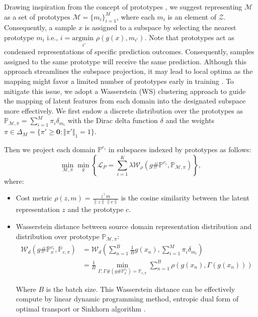 Drawing inspiration from the concept of prototypes \cite{snell2017prototypical}, we suggest representing $\mathcal{M}$ as a set of prototypes $\mathcal{M} = \{m_i\}_{i=1}^{M}$, where each $m_i$ is an element of $\mathcal{Z}$. Consequently, a sample $x$ is assigned to a subspace by selecting the nearest prototype $m_i$ i.e., $i=\underset{ i'}{\text{argmin }} \rho(g(x),m_{i'})$. Note that prototypes act as condensed representations of specific prediction outcomes. Consequently, samples assigned to the same prototype will receive the same prediction. Although this approach streamlines the subspace projection, it may lead to local optima as the mapping might favor a limited number of prototypes early in training \cite{vuong2023vector}. To mitigate this issue, we adopt a Wasserstein (WS) clustering approach \cite{vuong2023vector} to guide the mapping of latent features from each domain into the designated subspace more effectively.
We first endow a discrete distribution over the prototypes as $\mathbb{P}_{\mathcal{M},\pi}=\sum_{i=1}^{M}\pi_{i}\delta_{m_{i}}$
with the Dirac delta function $\delta$ and the weights $\pi\in\Delta_{M}= \{\pi'\geq \boldsymbol{0}: \Vert \pi'\Vert_1 =1\}$. 

Then we project each domain $\mathbb{P}^{e_i}$ in subspaces indexed by prototypes as follows:
\begin{equation}
\min_{\mathcal{M},\pi}\min_{g}\left \{\mathcal{L}_{P}=\sum_{i=1}^K\lambda\mathcal{W}_{\rho}\left(g\#\mathbb{P}^{e_i},\mathbb{P}_{\mathcal{M},\pi}\right)\right \},\label{eq:reconstruct_form_continuous}
\end{equation}
where:
\begin{itemize}
    \item Cost metric $\rho(z,m)=\frac{z^\top m}{\left \| z \right \|\left \| c \right \|}$ is the cosine similarity between the latent representation $z$ and the prototype $c$.
    \item  Wasserstein distance between source domain representation distribution and distribution over prototype $\mathbb{P}_{\mathcal{M},\pi}$:
\begin{align}
\mathcal{W}_{d}\left(g\#\mathbb{P}^{e_i}_{x},\mathbb{P}_{c,\pi}\right)
&=\mathcal{W}_{d}\left(\sum_{n=1}^{B}\frac{1}{B}g\left(x_{n}\right),\sum_{i=1}^{M}\pi_{i}\delta_{m_{i}}\right)\\
&=\frac{1}{B}\min_{\Gamma:\Gamma\#\left(g\#\mathbb{P}^{e_i}_{x}\right)=\mathbb{P}_{c,\pi}}\sum_{n=1}^{B}\rho\left(g\left(x_{n}\right),\Gamma\left(g\left(x_{n}\right)\right)\right)
\end{align}

Where $B$ is the batch size. This Wasserstein distance can be effectively compute by linear dynamic programming method, entropic dual form of optimal transport \citep{genevay2016stochastic} or Sinkhorn algorithm \cite{cuturi2013sinkhorn}.
\end{itemize}


